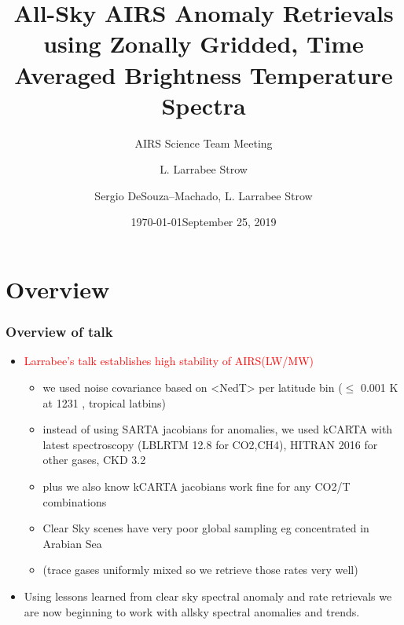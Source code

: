 \documentclass[10pt,t]{beamer}
\author{L. Larrabee Strow}
\date{\today}
\title{\large All-Sky AIRS Anomaly Retrievals \newline
  using Zonally Gridded, Time Averaged \newline
  Brightness Temperature Spectra}
\subtitle{\footnotesize{AIRS Science Team Meeting}}
\date{\vspace{0.1in}\footnotesize{September 25, 2019 \vfill}}
\author{Sergio DeSouza--Machado\inst{1,2}, L. Larrabee Strow\inst{1,2}}
\institute[UMBC]{\inst{1} UMBC Physics Dept. \and \inst{2}UMBC JCET}
\begin{document}
\maketitle
{}


\section{Overview}
\begin{frame}
  \frametitle{Overview of talk}
  \begin{itemize}
  \item \textcolor{red}{Larrabee's talk establishes high stability of AIRS(LW/MW)}
  \begin{itemize}
    \item we used noise covariance based on <NedT> per latitude bin \newline 
     ($\le$ 0.001 K at 1231 \wn, tropical latbins) 
    \item instead of using SARTA jacobians for anomalies, we used kCARTA with latest spectroscopy
    (LBLRTM 12.8 for CO2,CH4), HITRAN 2016 for other gases, CKD 3.2
    \item plus we also know kCARTA jacobians work fine for any CO2/T combinations
    \item Clear Sky scenes have very poor global sampling eg concentrated in Arabian Sea
    \item (trace gases uniformly mixed so we retrieve those rates very well)
  \end{itemize}
  \item Using lessons learned from clear sky spectral anomaly and rate retrievals 
     we are now beginning to work with  allsky spectral anomalies and trends.
  \end{itemize}
\end{frame}
\end{document}
